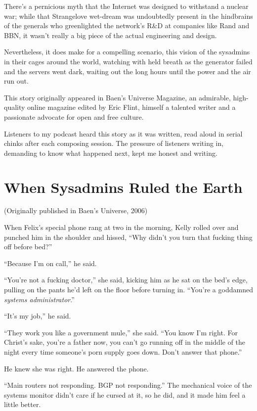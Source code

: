 There’s a pernicious myth that the Internet was designed to
withstand a nuclear war; while that Strangelove wet-dream was
undoubtedly present in the hindbrains of the generals who
greenlighted the network’s R\&D at companies like Rand and BBN, it
wasn’t really a big piece of the actual engineering and design.

Nevertheless, it does make for a compelling scenario, this vision
of the sysadmins in their cages around the world, watching with
held breath as the generator failed and the servers went dark,
waiting out the long hours until the power and the air run out.

This story originally appeared in Baen’s Universe Magazine, an
admirable, high-quality online magazine edited by Eric Flint,
himself a talented writer and a passionate advocate for open and
free culture.

Listeners to my podcast heard this story as it was written, read
aloud in serial chinks after each composing session. The pressure
of listeners writing in, demanding to know what happened next, kept
me honest and writing.

\section{When Sysadmins Ruled the Earth}

\textsf{(Originally published in Baen’s Universe, 2006)}

When Felix’s special phone rang at two in the morning, Kelly rolled
over and punched him in the shoulder and hissed, “Why didn’t you
turn that fucking thing off before bed?”

“Because I’m on call,” he said.

“You’re not a fucking doctor,” she said, kicking him as he sat on
the bed’s edge, pulling on the pants he’d left on the floor before
turning in. “You’re a goddamned \emph{systems administrator}.”

“It’s my job,” he said.

“They work you like a government mule,” she said. “You know I’m
right. For Christ’s sake, you’re a father now, you can’t go running
off in the middle of the night every time someone’s porn supply
goes down. Don’t answer that phone.”

He knew she was right. He answered the phone.

“Main routers not responding. BGP not responding.” The mechanical
voice of the systems monitor didn’t care if he cursed at it, so he
did, and it made him feel a little better.

